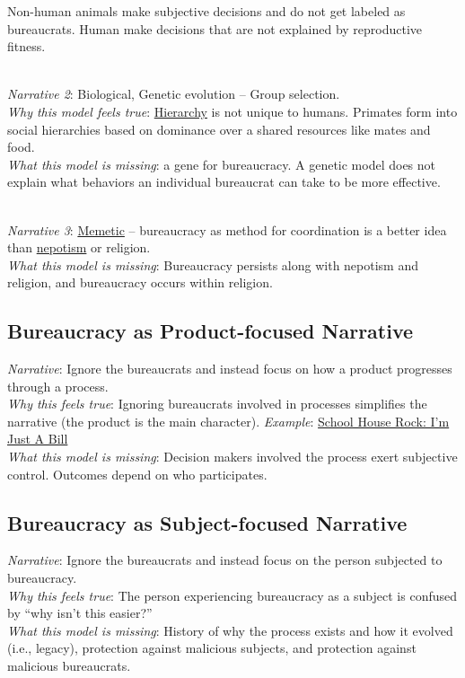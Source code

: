 Non-human animals make subjective decisions and do not get labeled as bureaucrats. Human make decisions that are not explained by reproductive fitness.

\ \\
\textit{Narrative 2}: Biological, Genetic evolution -- Group selection. \\
\textit{Why this model feels true}: \hyperref[sec:hierarchy-of-roles]{Hierarchy}
is not unique to humans. Primates form into social hierarchies based on dominance over a shared resources like mates and food. \\
\textit{What this model is missing}: a gene for bureaucracy. A genetic model does not explain what behaviors an individual bureaucrat can take to be more effective. 

\ \\
\textit{Narrative 3}: \href{https://en.wikipedia.org/wiki/Memetics}{Memetic}
-- bureaucracy as method for coordination is a better idea than \href{https://en.wikipedia.org/wiki/Nepotism}{nepotism} 
or religion. \\
\textit{What this model is missing}: Bureaucracy persists along with nepotism and religion, and bureaucracy occurs within religion. 

\subsection*{Bureaucracy as Product-focused Narrative}
\textit{Narrative}: Ignore the bureaucrats and instead focus on how a product progresses through a process.\\
\textit{Why this feels true}: Ignoring bureaucrats involved in processes simplifies the narrative (the product is the main character). 
\textit{Example}: \href{https://www.youtube.com/watch?v=OgVKvqTItto}{School House Rock: I'm Just A Bill}\\
\textit{What this model is missing}: Decision makers involved the process exert subjective control. Outcomes depend on who participates. 

\subsection*{Bureaucracy as Subject-focused Narrative}
\textit{Narrative}: Ignore the bureaucrats and instead focus on the person subjected to bureaucracy. \\
\textit{Why this feels true}: The person experiencing bureaucracy as a subject is confused by ``why isn't this easier?''  \\
\textit{What this model is missing}: History of why the process exists and how it evolved (i.e., legacy), protection against malicious subjects, and protection against malicious bureaucrats. 


